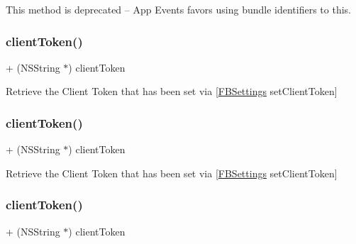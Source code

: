This method is deprecated -- App Events favors using bundle identifiers to this. \mbox{\label{interfaceFBSettings_afa1e8342398ddbdd7e6e9cd0a28094ac}} 
\subsubsection{\texorpdfstring{client\+Token()}{clientToken()}\hspace{0.1cm}{\footnotesize\ttfamily [1/5]}}
{\footnotesize\ttfamily + (N\+S\+String $\ast$) client\+Token \begin{DoxyParamCaption}{ }\end{DoxyParamCaption}}

Retrieve the Client Token that has been set via \mbox{[}\hyperlink{interfaceFBSettings}{F\+B\+Settings} set\+Client\+Token\mbox{]} \mbox{\label{interfaceFBSettings_afa1e8342398ddbdd7e6e9cd0a28094ac}} 
\subsubsection{\texorpdfstring{client\+Token()}{clientToken()}\hspace{0.1cm}{\footnotesize\ttfamily [2/5]}}
{\footnotesize\ttfamily + (N\+S\+String $\ast$) client\+Token \begin{DoxyParamCaption}{ }\end{DoxyParamCaption}}

Retrieve the Client Token that has been set via \mbox{[}\hyperlink{interfaceFBSettings}{F\+B\+Settings} set\+Client\+Token\mbox{]} \mbox{\label{interfaceFBSettings_afa1e8342398ddbdd7e6e9cd0a28094ac}} 
\subsubsection{\texorpdfstring{client\+Token()}{clientToken()}\hspace{0.1cm}{\footnotesize\ttfamily [3/5]}}
{\footnotesize\ttfamily + (N\+S\+String $\ast$) client\+Token \begin{DoxyParamCaption}{ }\end{DoxyParamCaption}}

